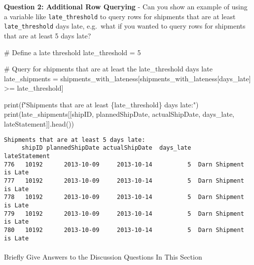 \documentclass[
  letterpaper,
  DIV=11,
  numbers=noendperiod]{scrartcl}
\makeatletter
\let\oldparagraph\paragraph
\renewcommand{\paragraph}{
    \@ifstar
      \xxxParagraphStar
      \xxxParagraphNoStar
  }
\newcommand{\xxxParagraphStar}[1]{\oldparagraph*{#1}\mbox{}}
\newcommand{\xxxParagraphNoStar}[1]{\oldparagraph{#1}\mbox{}}
\newenvironment{Shaded}{\begin{snugshade}}{\end{snugshade}}
\newcommand{\BuiltInTok}[1]{\textcolor[rgb]{0.00,0.23,0.31}{#1}}
\newcommand{\CommentTok}[1]{\textcolor[rgb]{0.37,0.37,0.37}{#1}}
\newcommand{\DecValTok}[1]{\textcolor[rgb]{0.68,0.00,0.00}{#1}}
\newcommand{\NormalTok}[1]{\textcolor[rgb]{0.00,0.23,0.31}{#1}}
\newcommand{\OperatorTok}[1]{\textcolor[rgb]{0.37,0.37,0.37}{#1}}
\newcommand{\SpecialCharTok}[1]{\textcolor[rgb]{0.37,0.37,0.37}{#1}}
\newcommand{\SpecialStringTok}[1]{\textcolor[rgb]{0.13,0.47,0.30}{#1}}
\newcommand{\StringTok}[1]{\textcolor[rgb]{0.13,0.47,0.30}{#1}}
\makeatother
\begin{document}
\begin{tcolorbox}
\textbf{Question 2: Additional Row Querying} - Can you show an example
of using a variable like \texttt{late\_threshold} to query rows for
shipments that are at least \texttt{late\_threshold} days late,
e.g.~what if you wanted to query rows for shipments that are at least 5
days late?

\begin{Shaded}
\begin{Highlighting}[]
\CommentTok{\# Define a late threshold}
\NormalTok{late\_threshold }\OperatorTok{=} \DecValTok{5}

\CommentTok{\# Query for shipments that are at least the late\_threshold days late}
\NormalTok{late\_shipments }\OperatorTok{=}\NormalTok{ shipments\_with\_lateness[shipments\_with\_lateness[}\StringTok{\textquotesingle{}days\_late\textquotesingle{}}\NormalTok{] }\OperatorTok{\textgreater{}=}\NormalTok{ late\_threshold]}

\BuiltInTok{print}\NormalTok{(}\SpecialStringTok{f"Shipments that are at least }\SpecialCharTok{\{}\NormalTok{late\_threshold}\SpecialCharTok{\}}\SpecialStringTok{ days late:"}\NormalTok{)}
\BuiltInTok{print}\NormalTok{(late\_shipments[[}\StringTok{\textquotesingle{}shipID\textquotesingle{}}\NormalTok{, }\StringTok{\textquotesingle{}plannedShipDate\textquotesingle{}}\NormalTok{, }\StringTok{\textquotesingle{}actualShipDate\textquotesingle{}}\NormalTok{, }\StringTok{\textquotesingle{}days\_late\textquotesingle{}}\NormalTok{, }\StringTok{\textquotesingle{}lateStatement\textquotesingle{}}\NormalTok{]].head())}
\end{Highlighting}
\end{Shaded}

\begin{verbatim}
Shipments that are at least 5 days late:
     shipID plannedShipDate actualShipDate  days_late          lateStatement
776   10192      2013-10-09     2013-10-14          5  Darn Shipment is Late
777   10192      2013-10-09     2013-10-14          5  Darn Shipment is Late
778   10192      2013-10-09     2013-10-14          5  Darn Shipment is Late
779   10192      2013-10-09     2013-10-14          5  Darn Shipment is Late
780   10192      2013-10-09     2013-10-14          5  Darn Shipment is Late
\end{verbatim}

\end{tcolorbox}

\paragraph{Briefly Give Answers to the Discussion Questions In This
Section}\label{briefly-give-answers-to-the-discussion-questions-in-this-section-1}
\end{document}
